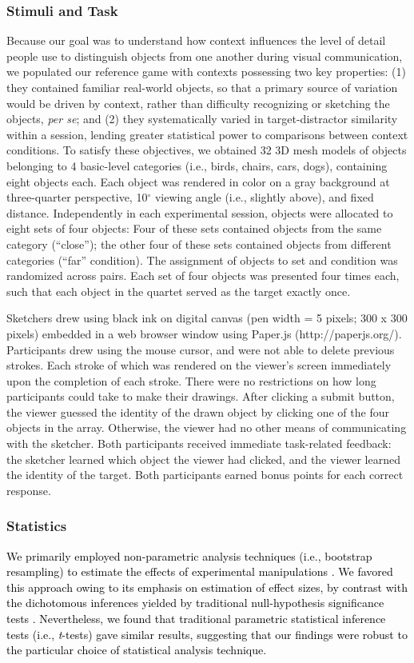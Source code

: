 \documentclass{svjour3}
\newcommand{\revised}[1]{\textcolor{Black}{#1}}
\begin{document}
\subsubsection*{Stimuli and Task}
Because our goal was to understand how context influences the level of detail people use to distinguish objects from one another during visual communication, we populated our reference game with contexts possessing two key properties: (1) they contained familiar real-world objects, so that a primary source of variation would be driven by context, rather than difficulty recognizing or sketching the objects, \textit{per se}; and (2) they systematically varied in target-distractor similarity within a session, lending greater statistical power to comparisons between context conditions. 
To satisfy these objectives, we obtained 32 3D mesh models of objects belonging to 4 basic-level categories (i.e., birds, chairs, cars, dogs), containing eight objects each. 
Each object was rendered in color on a gray background at three-quarter perspective, 10$^{\circ}$ viewing angle (i.e., slightly above), and fixed distance. 
Independently in each experimental session, objects were allocated to eight sets of four objects: Four of these sets contained objects from the same category (``close''); the other four of these sets contained objects from different categories (``far'' condition).
The assignment of objects to set and condition was randomized across pairs.
Each set of four objects was presented four times each, such that each object in the quartet served as the target exactly once. 

Sketchers drew using black ink on digital canvas (pen width = 5 pixels; 300 x 300 pixels) embedded in a web browser window using Paper.js (http://paperjs.org/). Participants drew using the mouse cursor, and were not able to delete previous strokes. Each stroke of which was rendered on the viewer's screen immediately upon the completion of each stroke. There were no restrictions on how long participants could take to make their drawings. After clicking a submit button, the viewer guessed the identity of the drawn object by clicking one of the four objects in the array. Otherwise, the viewer had no other means of communicating with the sketcher. Both participants received immediate task-related feedback: the sketcher learned which object the viewer had clicked, and the viewer learned the identity of the target. Both participants earned bonus points for each correct response.

\subsubsection*{Statistics}
\revised{We primarily employed non-parametric analysis techniques (i.e., bootstrap resampling) to estimate the effects of experimental manipulations \citep*{efron1994introduction}. We favored this approach owing to its emphasis on estimation of effect sizes, by contrast with the dichotomous inferences yielded by traditional null-hypothesis significance tests \citep*{cumming2014new}. Nevertheless, we found that traditional parametric statistical inference tests (i.e., \textit{t}-tests) gave similar results, suggesting that our findings were robust to the particular choice of statistical analysis technique.}
\end{document}
